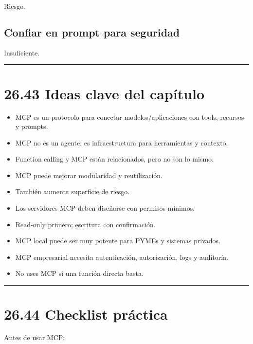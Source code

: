 Riesgo.

\subsection{Confiar en prompt para
seguridad}\label{confiar-en-prompt-para-seguridad-1}

Insuficiente.

\begin{center}\rule{0.5\linewidth}{0.5pt}\end{center}

\section{26.43 Ideas clave del
capítulo}\label{ideas-clave-del-capuxedtulo-25}

\begin{itemize}
\tightlist
\item
  MCP es un protocolo para conectar modelos/aplicaciones con tools,
  recursos y prompts.
\item
  MCP no es un agente; es infraestructura para herramientas y contexto.
\item
  Function calling y MCP están relacionados, pero no son lo mismo.
\item
  MCP puede mejorar modularidad y reutilización.
\item
  También aumenta superficie de riesgo.
\item
  Los servidores MCP deben diseñarse con permisos mínimos.
\item
  Read-only primero; escritura con confirmación.
\item
  MCP local puede ser muy potente para PYMEs y sistemas privados.
\item
  MCP empresarial necesita autenticación, autorización, logs y
  auditoría.
\item
  No uses MCP si una función directa basta.
\end{itemize}

\begin{center}\rule{0.5\linewidth}{0.5pt}\end{center}

\section{26.44 Checklist práctica}\label{checklist-pruxe1ctica-25}

Antes de usar MCP:

